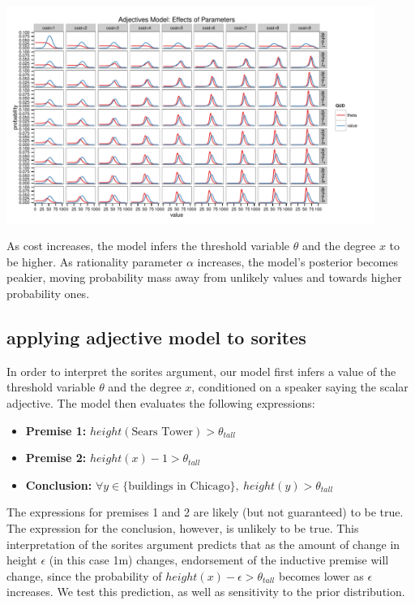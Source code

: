\documentclass[10pt]{article}
\begin{document}
    \includegraphics[width=0.9\textwidth]{toy_parameter_search.pdf}
    
    As cost increases, the model infers the threshold variable $\theta$ and the degree $x$ to be higher. As rationality parameter $\alpha$ increases, the model's posterior becomes peakier, moving probability mass away from unlikely values and towards higher probability ones.
    
%     
    
  \subsection{applying adjective model to sorites}
    In order to interpret the sorites argument, our model first infers a value of the threshold variable $\theta$ and the degree $x$, conditioned on a speaker saying the scalar adjective. The model then evaluates the following expressions:
        
    \begin{itemize}
    \item[] \textbf{Premise 1:} $height(\mbox{Sears Tower}) > \theta_{tall}$
    \item[] \textbf{Premise 2:} $height(x) - 1 > \theta_{tall}$
    \item[] \textbf{Conclusion:} $\forall y \in \{ \mbox{buildings in Chicago} \}, \ height(y) > \theta_{tall}$
    \end{itemize}
    
    The expressions for premises 1 and 2 are likely (but not guaranteed) to be true. The expression for the conclusion, however, is unlikely to be true. This interpretation of the sorites argument predicts that as the amount of change in height $\epsilon$ (in this case 1m) changes, endorsement of the inductive premise will change, since the probability of $height(x) - \epsilon > \theta_{tall}$ becomes lower as $\epsilon$ increases. We test this prediction, as well as sensitivity to the prior distribution.
    
\end{document}
